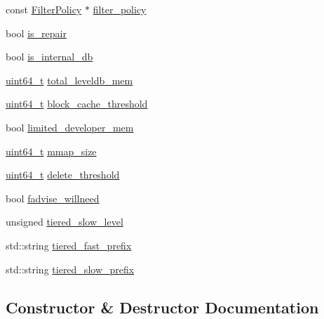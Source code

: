 \begin{DoxyCompactItemize}
const \hyperlink{classleveldb_1_1_filter_policy}{Filter\+Policy} $\ast$ \hyperlink{structleveldb_1_1_options_a24c88997a866d535e68de15b5c3cd02b}{filter\+\_\+policy}
\item 
bool \hyperlink{structleveldb_1_1_options_a8a5677213552c48bd10e9c487b4aeb66}{is\+\_\+repair}
\item 
bool \hyperlink{structleveldb_1_1_options_a2ad2e3e05e9fe7f687a7575449b04170}{is\+\_\+internal\+\_\+db}
\item 
\hyperlink{stdint_8h_aaa5d1cd013383c889537491c3cfd9aad}{uint64\+\_\+t} \hyperlink{structleveldb_1_1_options_a348ac8689c6500cb51ed397906a35f0a}{total\+\_\+leveldb\+\_\+mem}
\item 
\hyperlink{stdint_8h_aaa5d1cd013383c889537491c3cfd9aad}{uint64\+\_\+t} \hyperlink{structleveldb_1_1_options_aac08652c9783dee9b0b67c5a53721474}{block\+\_\+cache\+\_\+threshold}
\item 
bool \hyperlink{structleveldb_1_1_options_a3b2390e7bee2645730301f4d89b5915c}{limited\+\_\+developer\+\_\+mem}
\item 
\hyperlink{stdint_8h_aaa5d1cd013383c889537491c3cfd9aad}{uint64\+\_\+t} \hyperlink{structleveldb_1_1_options_ad1c2c7c91d7356d91634902bfaf8c232}{mmap\+\_\+size}
\item 
\hyperlink{stdint_8h_aaa5d1cd013383c889537491c3cfd9aad}{uint64\+\_\+t} \hyperlink{structleveldb_1_1_options_acbf4ebba6f5ff369bcea327411185c4c}{delete\+\_\+threshold}
\item 
bool \hyperlink{structleveldb_1_1_options_ae998bf57c80ba45500dbb84576dd86fe}{fadvise\+\_\+willneed}
\item 
unsigned \hyperlink{structleveldb_1_1_options_a788ce6ae44d475dad52b510fdf23b70e}{tiered\+\_\+slow\+\_\+level}
\item 
std\+::string \hyperlink{structleveldb_1_1_options_aa3ab388db3e224cb44151764c2167756}{tiered\+\_\+fast\+\_\+prefix}
\item 
std\+::string \hyperlink{structleveldb_1_1_options_a56322d593e1f4b35b07b184ddfaad264}{tiered\+\_\+slow\+\_\+prefix}
\end{DoxyCompactItemize}


\subsection{Constructor \& Destructor Documentation}
\hypertarget{structleveldb_1_1_options_a52d77c894795ba83077045daeab3d581}{}
